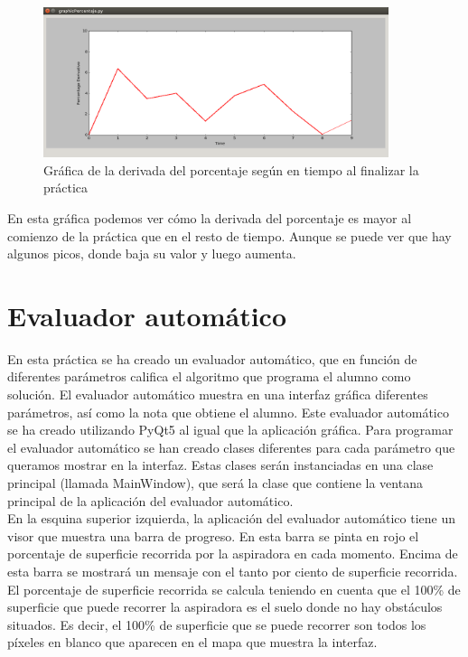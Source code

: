 \begin{figure}[H]
  \begin{center}
    \includegraphics[width=0.9\textwidth]{figures/Vacuum/Porcentaje_Roomba.png}
		\caption{Gráfica de la derivada del porcentaje según en tiempo al finalizar la práctica}
		\label{fig.Porcentaje_Roomba}
		\end{center}
\end{figure}

En esta gráfica podemos ver cómo la derivada del porcentaje es mayor al comienzo de la práctica que en el resto de tiempo. Aunque se puede ver que hay algunos picos, donde baja su valor y luego aumenta.


\section{Evaluador automático}
En esta práctica se ha creado un evaluador automático, que en función de diferentes parámetros califica el algoritmo que programa el alumno como solución. El evaluador automático muestra en una interfaz gráfica diferentes parámetros, así como la nota que obtiene el alumno. Este evaluador automático se ha creado utilizando PyQt5 al igual que la aplicación gráfica. Para programar el evaluador automático se han creado clases diferentes para cada parámetro que queramos mostrar en la interfaz. Estas clases serán instanciadas en una clase principal (llamada MainWindow), que será la clase que contiene la ventana principal de la aplicación del evaluador automático.\\

En la esquina superior izquierda, la aplicación del evaluador automático tiene un visor que muestra una barra de progreso. En esta barra se pinta en rojo el porcentaje de superficie recorrida por la aspiradora en cada momento. Encima de esta barra se mostrará un mensaje con el tanto por ciento de superficie recorrida. El porcentaje de superficie recorrida se calcula teniendo en cuenta que el 100\% de superficie que puede recorrer la aspiradora es el suelo donde no hay obstáculos situados. Es decir, el 100\% de superficie que se puede recorrer son todos los píxeles en blanco que aparecen en el mapa que muestra la interfaz.\\

